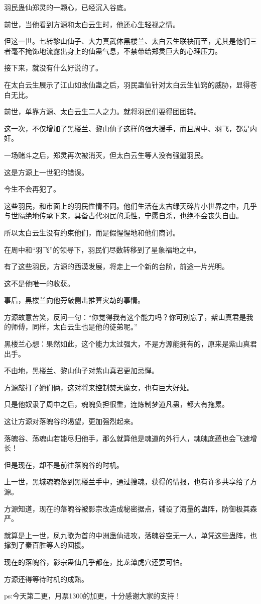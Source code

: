 \begin{this_body}
羽民蛊仙郑灵的一颗心，已经沉入谷底。

前世，当他看到方源和太白云生时，他还心生轻视之情。

但这一世。七转黎山仙子、大力真武体黑楼兰、太白云生联袂而至，尤其是他们三者毫不掩饰地流露出身上的仙蛊气息，不禁带给郑灵巨大的心理压力。

接下来，就没有什么好说的了。

在太白云生展示了江山如故仙蛊之后，羽民蛊仙针对太白云生仙窍的威胁，显得苍白无比。

前世，单靠方源、太白云生二人之力。就将羽民们耍得团团转。

这一次，不仅增加了黑楼兰、黎山仙子这样的强大援手，而且周中、羽飞，都是内奸。

一场赌斗之后，郑灵再次被消灭，但太白云生等人没有强逼羽民。

这是方源上一世犯的错误。

今生不会再犯了。

这些羽民，和市面上的羽民性情不同。他们生活在太古绿天碎片小世界之中，几乎与世隔绝地传承下来，具备古代羽民的秉性，宁愿自杀，也绝不会丧失自由。

所以太白云生没有约束他们，而是假惺惺地和他们商讨。

在周中和“羽飞”的领导下，羽民们尽数转移到了星象福地之中。

有了这些羽民，方源的西漠发展，将走上一个新的台阶，前途一片光明。

这不是他唯一的收获。

事后，黑楼兰向他旁敲侧击推算灾劫的事情。

方源故意苦笑，反问一句：“你觉得我有这个能力吗？你可别忘了，紫山真君是我的师傅，同样，太白云生也是他的徒弟呢。”

黑楼兰心想：果然如此，这个能力太过强大，不是方源能拥有的，原来是紫山真君出手。

不由地，黑楼兰、黎山仙子对紫山真君更加忌惮。

方源敲打了她们俩，这对将来控制焚天魔女，也有巨大好处。

只是他奴隶了周中之后，魂魄负担很重，连炼制梦道凡蛊，都大有拖累。

这让方源对落魄谷的渴望，更加强烈起来。

落魄谷、荡魂山若能尽归他手，那么就算他是魂道的外行人，魂魄底蕴也会飞速增长！

但是现在，却不是前往落魄谷的时机。

上一世，黑城魂魄落到黑楼兰手中，通过搜魂，获得的情报，也有许多共享给了方源。

方源知道，现在的落魄谷被影宗改造成秘密据点，铺设了海量的蛊阵，防御极其森严。

就算是上一世，凤九歌为首的中洲蛊仙进攻，落魄谷空无一人，单凭这些蛊阵，也撑到了秦百胜等人的回援。

现在的落魄谷，影宗蛊仙几乎都在，比龙潭虎穴还要可怕。

方源还得等待时机的成熟。

ps:今天第二更，月票1300的加更，十分感谢大家的支持！

\end{this_body}


